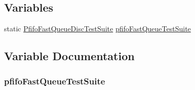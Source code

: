 \subsection*{Variables}
\begin{DoxyCompactItemize}
\item 
static \hyperlink{classPfifoFastQueueDiscTestSuite}{Pfifo\+Fast\+Queue\+Disc\+Test\+Suite} \hyperlink{pfifo-fast-queue-disc-test-suite_8cc_aa6f028fcfef51e3d8133c108974c0867}{pfifo\+Fast\+Queue\+Test\+Suite}
\end{DoxyCompactItemize}


\subsection{Variable Documentation}
\subsubsection[{\texorpdfstring{pfifo\+Fast\+Queue\+Test\+Suite}{pfifoFastQueueTestSuite}}]{ pfifo\+Fast\+Queue\+Test\+Suite\hspace{0.3cm}{\ttfamily [static]}}\hypertarget{pfifo-fast-queue-disc-test-suite_8cc_aa6f028fcfef51e3d8133c108974c0867}{}\label{pfifo-fast-queue-disc-test-suite_8cc_aa6f028fcfef51e3d8133c108974c0867}
